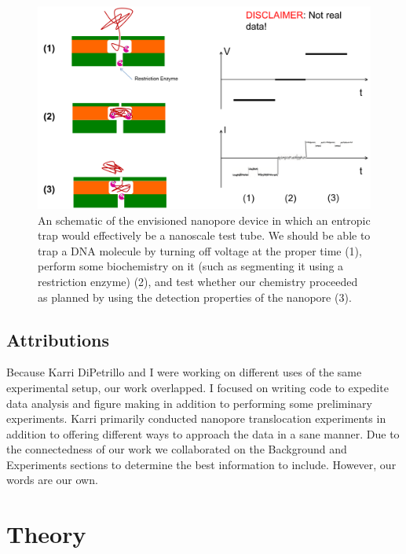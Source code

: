 \documentclass[aps,prl,preprint,groupedaddress]{revtex4}
\begin{document}
\begin{figure}
\centering
\includegraphics[width=1\textwidth]{figures/idealized-trapping}
\caption{An schematic of the envisioned nanopore device in which an entropic trap would effectively be a nanoscale test tube. We should be able to trap a DNA molecule by turning off voltage at the proper time (1), perform some biochemistry on it (such as segmenting it using a restriction enzyme) (2), and test whether our chemistry proceeded as planned by using the detection properties of the nanopore (3).}
\label{fig:trapped-and-snipped}
\end{figure}

\subsection{Attributions}
Because Karri DiPetrillo and I were working on different uses of the same experimental setup, our work overlapped.
I focused on writing code to expedite data analysis and figure making in addition to performing some preliminary experiments.
Karri primarily conducted nanopore translocation experiments in addition to offering different ways to approach the data in a sane manner.
Due to the connectedness of our work we collaborated on the Background and Experiments sections to determine the best information to include.
However, our words are our own.
\section{Theory}
\end{document}
